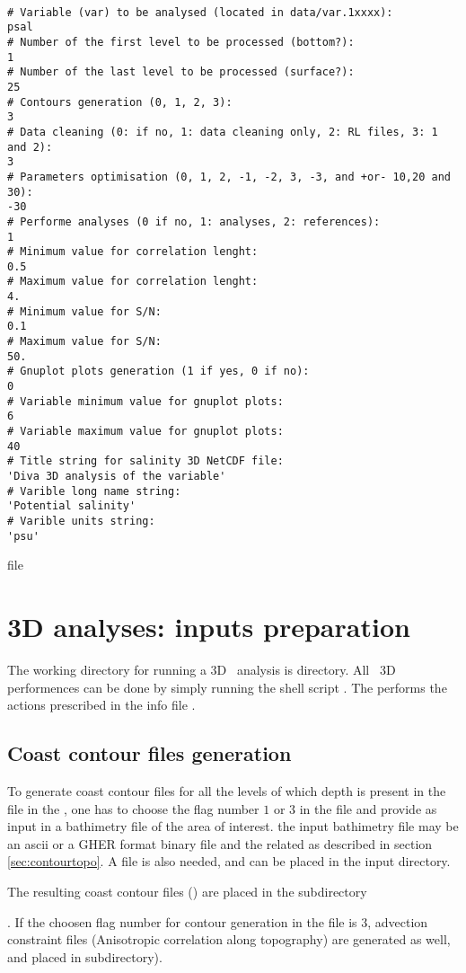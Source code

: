 {\begin{exfile}[H] %
\begin{footnotesize}
\begin{verbatim}

# Variable (var) to be analysed (located in data/var.1xxxx):
psal
# Number of the first level to be processed (bottom?):
1
# Number of the last level to be processed (surface?):
25
# Contours generation (0, 1, 2, 3):
3
# Data cleaning (0: if no, 1: data cleaning only, 2: RL files, 3: 1 and 2):
3
# Parameters optimisation (0, 1, 2, -1, -2, 3, -3, and +or- 10,20 and 30):
-30
# Performe analyses (0 if no, 1: analyses, 2: references):
1
# Minimum value for correlation lenght:
0.5
# Maximum value for correlation lenght:
4.
# Minimum value for S/N:
0.1
# Maximum value for S/N:
50.
# Gnuplot plots generation (1 if yes, 0 if no):
0
# Variable minimum value for gnuplot plots:
6
# Variable maximum value for gnuplot plots:
40
# Title string for salinity 3D NetCDF file:
'Diva 3D analysis of the variable'
# Varible long name string:
'Potential salinity'
# Varible units string:
'psu'
\end{verbatim}
\end{footnotesize}
\caption{ file}
\label{3Dinfotfile}
\end{exfile}

\section{3D analyses: inputs preparation \label{3Dpreproc}}

The working directory for running a 3D \diva\ analysis is   directory. All \diva\ 3D performences can be done by simply running the shell script . The  performs the actions prescribed in the info file .


\subsection{Coast contour files generation \label{contgeneration}}

To generate coast contour files for all the levels of which depth is present in the  file in the , one has to choose the flag number $1$ or $3$ in the  file and provide as input in  a bathimetry file of the area of interest. the input bathimetry file may be an ascii   or a GHER format binary file   and the related  as described in section \ref{sec:contourtopo}. A  file is also needed, and can be placed in the   input directory.

 The resulting coast contour files () are placed in the subdirectory\linebreak {}}. If the choosen flag number for contour generation in the  file is $3$, advection constraint files (Anisotropic correlation along topography) are generated as well, and placed in  subdirectory).
